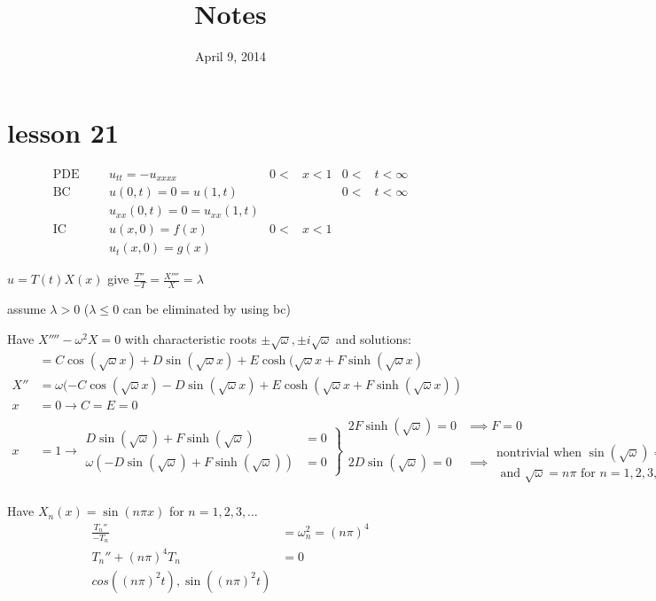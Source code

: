 \documentclass{article}
\begin{document}
\title{Notes}
\date{April 9, 2014}
\maketitle
\section*{lesson 21}
\begin{align*}
  \text{PDE}&&&u_{tt}=-u_{xxxx}&0<&x<1&0<&t<\infty\\
  \text{BC}&&&u(0,t)=0=u(1,t)&&&0<&t<\infty\\
  &&&u_{xx}(0,t)=0=u_{xx}(1,t)\\
  \text{IC}&&&u(x,0)=f(x)&0<&x<1\\
  &&&u_t(x,0)=g(x)
\end{align*}

$u=T(t)X(x)$ give $\frac{T''}{-T}=\frac{X''''}{X}=\lambda$

assume $\lambda>0$ ($\lambda\le0$ can be eliminated by using bc)

Have $X''''-\omega^2X=0$ with characteristic roots $\pm\sqrt{\omega},\pm i\sqrt{\omega}$ and solutions:
\begin{align*}
  &=C\cos(\sqrt{\omega}x)+D\sin(\sqrt{\omega}x)+E\cosh(\sqrt{\omega}x+F\sinh(\sqrt{\omega}x)\\
  X''&=\omega(-C\cos(\sqrt{\omega}x)-D\sin(\sqrt{\omega}x)+E\cosh(\sqrt{\omega}x+F\sinh(\sqrt{\omega}x))\\
  x&=0\to C=E=0\\
  x&=1\to\left.\begin{aligned}
    D\sin(\sqrt{\omega})+F\sinh(\sqrt{\omega})&=0\\
    \omega(-D\sin(\sqrt{\omega})+F\sinh(\sqrt{\omega}))&=0
  \end{aligned}\right\}\begin{aligned}
    2F\sinh(\sqrt{\omega})=0&\implies F=0\\
    2D\sin(\sqrt{\omega})=0&\implies\begin{aligned}\text{nontrivial when $\sin(\sqrt{\omega})=0$}\\\text{ and $\sqrt{\omega}=n\pi$ for $n=1,2,3,\dots$} 
    \end{aligned}
  \end{aligned}
\end{align*}

Have $X_n(x)=\sin(n\pi x)$ for $n=1,2,3,\dots$
\begin{align*}
  \frac{{T_n}''}{-T_n}&=\omega_n^2=(n\pi)^4\\
  T_n''+(n\pi)^4T_n&=0\\
  cos((n\pi)^2t),\sin((n\pi)^2t)
\end{align*}
\end{document}
